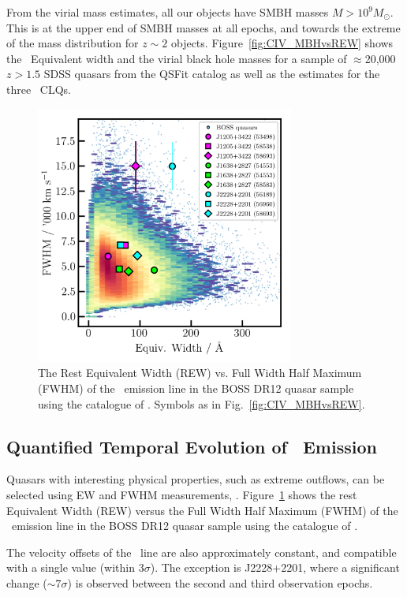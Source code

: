 \documentclass[fleqn,usenatbib]{mnras}
\begin{document}
From the virial mass estimates, all our objects have SMBH masses $M
>10^{9} M_{\odot}$.  This is at the upper end of SMBH masses at all
epochs, and towards the extreme of the mass distribution for $z\sim2$
objects.  Figure~\ref{fig:CIV_MBHvsREW} shows the \civ\ Equivalent
width and the virial black hole masses for a sample of $\approx$20,000
$z>1.5$ SDSS quasars from the QSFit catalog as well as the estimates
for the three \civ\ CLQs.



\begin{figure}
  \centering
  \includegraphics[width=8.5cm, trim=0.2cm 0.2cm 0.0cm 0.2cm, clip]
  {figures/CIV_CLQs_REWvsFWHM_20191128.png}
  \vspace{-12pt}
  \caption[]{The Rest Equivalent Width (REW) vs. Full Width Half Maximum (FWHM) 
    of the \civ\ emission line in the BOSS DR12 quasar sample using the catalogue 
    of \citet{Hamann2017}.
   Symbols as in Fig.~\ref{fig:CIV_MBHvsREW}.}
  \label{fig:REWvsFWHM}
\end{figure}
\subsection{Quantified Temporal Evolution of \civ\ Emission}
Quasars with interesting physical properties, such as extreme
outflows, can be selected using EW and FWHM measurements, \citep[e.g.,
the ``Extremely Red Quasars'' (ERQs)][]{Ross2015, Zakamska2016,
Hamann2017, Zakamska2019}. Figure~\ref{fig:REWvsFWHM} shows the rest
Equivalent Width (REW) versus the Full Width Half Maximum (FWHM) of
the \civ\ emission line in the BOSS DR12 quasar sample using the
catalogue of \citet{Hamann2017}.

The velocity offsets of the \civ\ line are also
approximately constant, and compatible with a single value (within
3$\sigma$).  The exception is J2228+2201, where a significant change
($\sim$7$\sigma$) is observed between the second and third observation
epochs.
\end{document}
